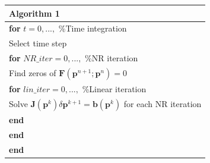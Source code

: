\documentclass[12pt]{article}
\begin{document}
\begin{table}[!h]\centering
\begin{minipage}{.7\textwidth}
\begin{tabular}{ |l| } 
\hline
\textbf{Algorithm 1}\\
\hline
\hline
\hspace{0.5cm}\textbf{for} $t=0,...,$    \hspace{52mm}    \%Time integration \\
\hspace{1cm} Select time step\\
\hspace{1cm}\textbf{for} $NR\_iter=0,...,$    \hspace{34mm}    \%NR iteration\\
 \hspace{1.5cm} Find zeros of $\mathbf{F}(\mathbf{p}^{n+1};\mathbf{p}^n)=0$\\
\hspace{1.5cm}\textbf{for} $lin\_iter=0,...,$    \hspace{31mm}    \%Linear iteration \\
\hspace{2cm}Solve $\mathbf{J}(\mathbf{p}^k)\delta \mathbf{p}^{k+1}=\mathbf{b}(\mathbf{p}^k)$ for each NR iteration\\
\hspace{1.5cm}\textbf{end}\\
\hspace{1cm}\textbf{end}\\
\hspace{0.5cm}\textbf{end}\\
\hline
\end{tabular}
\end{minipage}
\end{table}
 
\newpage
\end{document}
